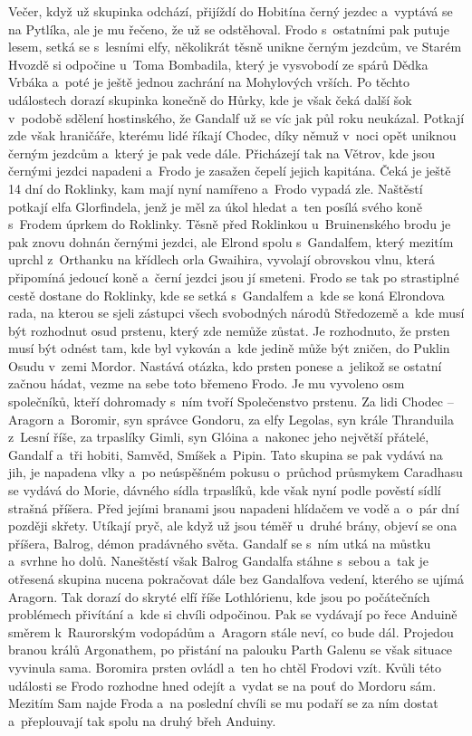 {{	Večer, když už skupinka odchází, přijíždí do Hobitína černý jezdec
	a~vyptává se na Pytlíka, ale je mu řečeno, že už se odstěhoval. Frodo
	s ostatními pak putuje lesem, setká se s lesními elfy, několikrát těsně
	unikne černým jezdcům, ve Starém Hvozdě si odpočine u~Toma Bombadila, který
	je vysvobodí ze spárů Dědka Vrbáka a~poté je ještě jednou zachrání na
	Mohylových vrších. Po těchto událostech dorazí skupinka konečně do Hůrky,
	kde je však čeká další šok v podobě sdělení hostinského, že Gandalf už se
	víc jak půl roku neukázal. Potkají zde však hraničáře, kterému lidé říkají
	Chodec, díky němuž v noci opět uniknou černým jezdcům a~který je pak vede
	dále. Přicházejí tak na Větrov, kde jsou černými jezdci napadeni a~Frodo je
	zasažen čepelí jejich kapitána. Čeká je ještě 14 dní do Roklinky, kam mají
	nyní namířeno a~Frodo vypadá zle. Naštěstí potkají elfa Glorfindela, jenž
	je měl za úkol hledat a~ten posílá svého koně s Frodem úprkem do Roklinky.
	Těsně před Roklinkou u~Bruinenského brodu je pak znovu dohnán černými
	jezdci, ale Elrond spolu s Gandalfem, který mezitím uprchl z Orthanku na
	křídlech orla Gwaihira, vyvolají obrovskou vlnu, která připomíná jedoucí
	koně a~černí jezdci jsou jí smeteni. Frodo se tak po strastiplné cestě
	dostane do Roklinky, kde se setká s Gandalfem a~kde se koná Elrondova rada,
	na kterou se sjeli zástupci všech svobodných národů Středozemě a~kde musí
	být rozhodnut osud prstenu, který zde nemůže zůstat. Je rozhodnuto, že
	prsten musí být odnést tam, kde byl vykován a~kde jedině může být zničen,
	do Puklin Osudu v zemi Mordor. Nastává otázka, kdo prsten ponese a~jelikož
	se ostatní začnou hádat, vezme na sebe toto břemeno Frodo. Je mu vyvoleno
	osm společníků, kteří dohromady s ním tvoří Společenstvo prstenu. Za lidi
	Chodec -- Aragorn a~Boromir, syn správce Gondoru, za elfy Legolas, syn
	krále Thranduila z Lesní říše, za trpaslíky Gimli, syn Glóina a~nakonec
	jeho největší přátelé, Gandalf a~tři hobiti, Samvěd, Smíšek a~Pipin. Tato
	skupina se pak vydává na jih, je napadena vlky a~po neúspěšném pokusu
	o~průchod průsmykem Caradhasu se vydává do Morie, dávného sídla trpaslíků,
	kde však nyní podle pověstí sídlí strašná příšera. Před jejími branami jsou
	napadeni hlídačem ve vodě a~o~pár dní později skřety. Utíkají pryč, ale
	když už jsou téměř u~druhé brány, objeví se ona příšera, Balrog, démon
	pradávného světa. Gandalf se s ním utká na můstku a~svrhne ho dolů.
	Naneštěstí však Balrog Gandalfa stáhne s sebou a~tak je otřesená skupina
	nucena pokračovat dále bez Gandalfova vedení, kterého se ujímá Aragorn. Tak
	dorazí do skryté elfí říše Lothlórienu, kde jsou po počátečních problémech
	přivítání a~kde si chvíli odpočinou. Pak se vydávají po řece Anduině směrem
	k Raurorským vodopádům a~Aragorn stále neví, co bude dál. Projedou branou
	králů Argonathem, po přistání na palouku Parth Galenu se však situace
	vyvinula sama. Boromira prsten ovládl a~ten ho chtěl Frodovi vzít. Kvůli
	této události se Frodo rozhodne hned odejít a~vydat se na pouť do Mordoru
	sám. Mezitím Sam najde Froda a~na poslední chvíli se mu podaří se za ním
	dostat a~přeplouvají tak spolu na druhý břeh Anduiny.
}

}
